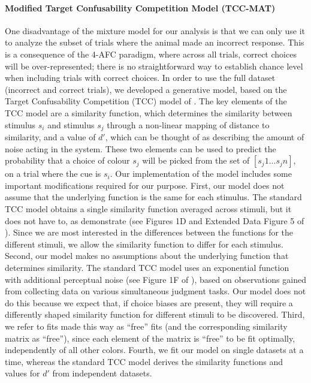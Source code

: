 \paragraph{Modified Target Confusability Competition Model (TCC-MAT)}\label{para:TCC}
One disadvantage of the mixture model for our analysis is that we can only use it to analyze the subset of trials where the animal made an incorrect response.
This is a consequence of the 4-AFC paradigm, where across all trials, correct choices will be over-represented; there is no straightforward way to establish chance level when including trials with correct choices. 
In order to use the full dataset (incorrect and correct trials), we developed a generative model, based on the Target Confusability Competition (TCC) model of \cite{schurgin_psychophysical_2020}. 
The key elements of the TCC model are a similarity function, which determines the similarity between stimulus $s_i$ and stimulus $s_j$ through a non-linear mapping of distance to similarity, and a value of $d'$, which can be thought of as describing the amount of noise acting in the system. 
These two elements can be used to predict the probability that a choice of colour $s_j$ will be picked from the set of $[s_j1...s_jn ]$, on a trial where the cue is $s_i$. 
Our implementation of the model includes some important modifications required for our purpose.
First, our model does not assume that the underlying function is the same for each stimulus. 
The standard TCC model obtains a single similarity function averaged across stimuli, but it does not have to, as \cite{schurgin_psychophysical_2020} demonstrate (see Figures 1D and Extended Data Figure 5 of \cite{schurgin_psychophysical_2020}). 
Since we are most interested in the differences between the functions for the different stimuli, we allow the similarity function to differ for each stimulus. 
Second, our model makes no assumptions about the underlying function that determines similarity. 
The standard TCC model uses an exponential function with additional perceptual noise (see Figure 1F of \cite{schurgin_psychophysical_2020}), based on observations gained from collecting data on various simultaneous judgment tasks. 
Our model does not do this because we expect that, if choice biases are present, they will require a differently shaped similarity function for different stimuli to be discovered. 
Third, we refer to fits made this way as “free” fits (and the corresponding similarity matrix as “free”), since each element of the matrix is “free” to be fit optimally, independently of all other colors. 
Fourth, we fit our model on single datasets at a time, whereas the standard TCC model derives the similarity functions and values for $d'$ from independent datasets.

